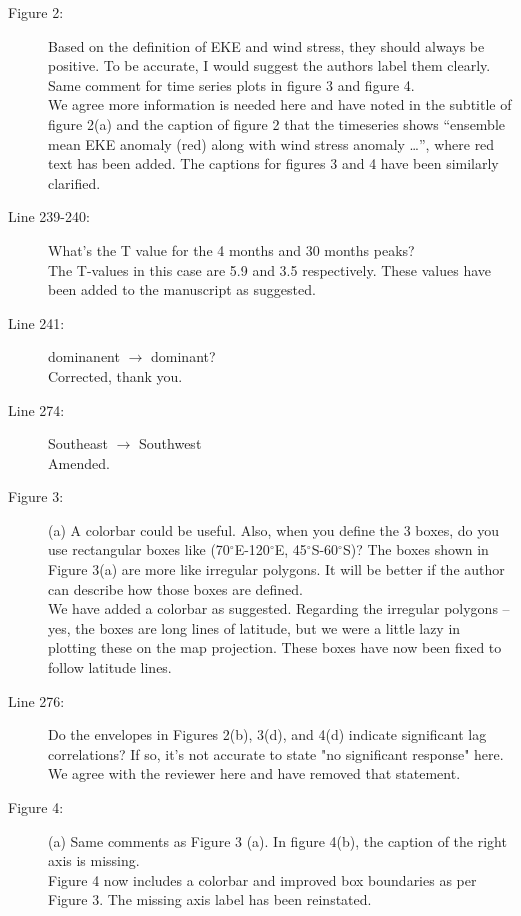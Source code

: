 \documentclass[11pt]{article}
\begin{document}
{\begin{description}
\item[Figure 2:] Based on the definition of EKE and wind stress, they should always be positive. To be accurate, I would suggest the authors label them clearly. Same comment for time series plots in figure 3 and figure 4. \\
{\color{black} We agree more information is needed here and have noted in the subtitle of figure 2(a) and the caption of figure 2 that the timeseries shows ``ensemble mean {\color{red}EKE anomaly} (red) along with wind stress {\color{red}anomaly} \ldots'', where red text has been added. 
The captions for figures 3 and 4 have been similarly clarified.}

\item[Line 239-240:] What's the T value for the 4 months and 30 months peaks? \\
{\color{black} The T-values in this case are 5.9 and 3.5 respectively. 
These values have been added to the manuscript as suggested.  }

\item[Line 241:] dominanent $\to$ dominant?\\
{\color{black} Corrected, thank you. }

\item[Line 274:] Southeast $\to$ Southwest\\
{\color{black} Amended. }

\item[Figure 3:] (a) A colorbar could be useful. Also, when you define the 3 boxes, do you use rectangular boxes like (70$^\circ$E-120$^\circ$E, 45$^\circ$S-60$^\circ$S)? The boxes shown in Figure 3(a) are more like irregular polygons. It will be better if the author can describe how those boxes are defined. \\
{\color{black}  We have added a colorbar as suggested. Regarding the irregular polygons -- yes, the boxes are long lines of latitude, but we were a little lazy in plotting these on the map projection. These boxes have now been fixed to follow latitude lines. }

\item[Line 276:] Do the envelopes in Figures 2(b), 3(d), and 4(d) indicate significant lag correlations? If so, it's not accurate to state "no significant response" here.\\
{\color{black} We agree with the reviewer here and have removed that statement. }

\item[Figure 4:] (a) Same comments as Figure 3 (a). In figure 4(b), the caption of the right axis is missing. \\
{\color{black}  Figure 4 now includes a colorbar and improved box boundaries as per Figure 3.
The missing axis label has been reinstated.}


\end{description}}
\end{document}
